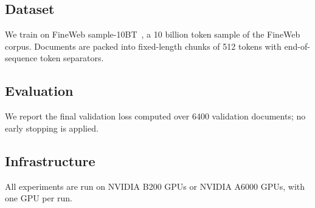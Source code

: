 \subsection{Dataset}

We train on FineWeb sample-10BT~\citep{penedo2024fineweb}, a 10 billion token sample of the FineWeb corpus. Documents are packed into fixed-length chunks of 512 tokens with end-of-sequence token separators.

\subsection{Evaluation}

We report the final validation loss computed over 6400 validation documents; no early stopping is applied.

\subsection{Infrastructure}

All experiments are run on NVIDIA B200 GPUs or NVIDIA A6000 GPUs, with one GPU per run.
